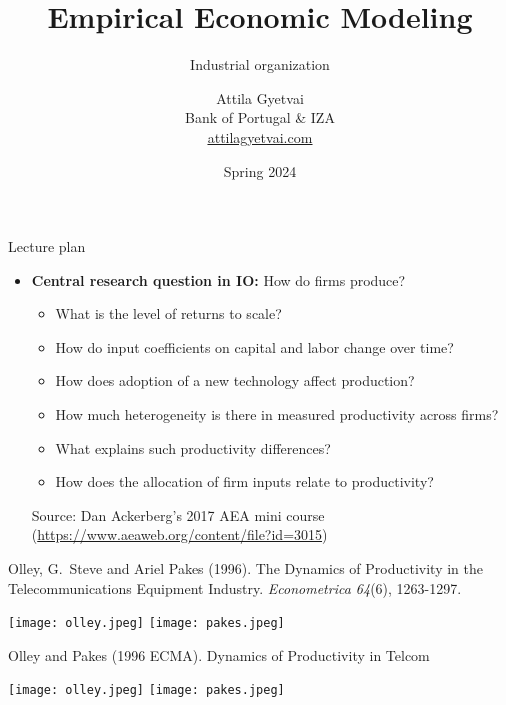 \documentclass[aspectratio=169,compress,t,xcolor=table]{beamer}
\title[]{Empirical Economic Modeling}
\subtitle{Industrial organization}
\author[]{%
  \texorpdfstring{%
    Attila Gyetvai \\ \vspace*{0.5em} \footnotesize Bank of Portugal \& IZA \\ \href{https://attilagyetvai.com}{\color{MyStructure}\ul{attilagyetvai.com}}
  }{Gyetvai}
}
\date[]{\footnotesize Spring 2024}
\begin{document}
{
\begin{frame}
  \titlepage
\end{frame}
}
\addtocounter{framenumber}{-1}

\begin{frame}{Lecture plan}
  \begin{itemize}
    \vfill\item {\color{MyStructure}\textbf{Central research question in IO:}} How do firms produce?
    \begin{itemize}
      \addtolength{\baselineskip}{1em}
      \item What is the level of returns to scale?
      \item How do input coefficients on capital and labor change over time?
      \item How does adoption of a new technology affect production?
      \item How much heterogeneity is there in measured productivity across firms?
      \item What explains such productivity differences?
      \item How does the allocation of firm inputs relate to productivity?
    \end{itemize}
    \vspace*{1em}
    {\scriptsize Source: Dan Ackerberg's 2017 AEA mini course (\href{https://www.aeaweb.org/content/file?id=3015}{https://www.aeaweb.org/content/file?id=3015})}
  \end{itemize}
\end{frame}

\begin{frame}{}
Olley, G.\ Steve and Ariel Pakes (1996). The Dynamics of Productivity in the Telecommunications Equipment Industry. \textit{Econometrica 64}(6), 1263-1297.
  \begin{center}
    \texttt{[image: olley.jpeg]} \hspace*{1em}
    \texttt{[image: pakes.jpeg]}
  \end{center}
\end{frame}
\addtocounter{framenumber}{-1}

\begin{frame}{}
Olley  and Pakes (1996 ECMA). Dynamics of Productivity in Telcom \\ \phantom{you}
  \begin{center}
    \texttt{[image: olley.jpeg]} \hspace*{1em}
    \texttt{[image: pakes.jpeg]}
  \end{center}
\end{frame}
\addtocounter{framenumber}{-1}
\end{document}
